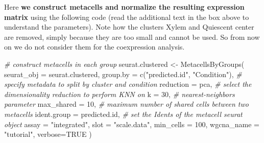 \documentclass[
  letterpaper,
  DIV=11,
  numbers=noendperiod]{scrartcl}
\newenvironment{Shaded}{\begin{snugshade}}{\end{snugshade}}
\newcommand{\AttributeTok}[1]{\textcolor[rgb]{0.49,0.56,0.16}{#1}}
\newcommand{\CommentTok}[1]{\textcolor[rgb]{0.38,0.63,0.69}{\textit{#1}}}
\newcommand{\ConstantTok}[1]{\textcolor[rgb]{0.53,0.00,0.00}{#1}}
\newcommand{\DecValTok}[1]{\textcolor[rgb]{0.25,0.63,0.44}{#1}}
\newcommand{\FunctionTok}[1]{\textcolor[rgb]{0.02,0.16,0.49}{#1}}
\newcommand{\NormalTok}[1]{\textcolor[rgb]{0.00,0.44,0.13}{#1}}
\newcommand{\OtherTok}[1]{\textcolor[rgb]{0.00,0.44,0.13}{#1}}
\newcommand{\StringTok}[1]{\textcolor[rgb]{0.25,0.44,0.63}{#1}}
\begin{document}
Here \textbf{we construct metacells and normalize the resulting
expression matrix} using the following code (read the additional text in
the box above to understand the parameters). Note how the clusters Xylem
and Quiescent center are removed, simply because they are too small and
cannot be used. So from now on we do not consider them for the
coexpression analysis.

\begin{Shaded}
\begin{Highlighting}[]
\CommentTok{\# construct metacells  in each group}
\NormalTok{seurat.clustered }\OtherTok{\textless{}{-}} \FunctionTok{MetacellsByGroups}\NormalTok{(}
  \AttributeTok{seurat\_obj =}\NormalTok{ seurat.clustered,}
  \AttributeTok{group.by =} \FunctionTok{c}\NormalTok{(}\StringTok{"predicted.id"}\NormalTok{, }\StringTok{"Condition"}\NormalTok{), }\CommentTok{\# specify metadata to split by cluster and condition}
  \AttributeTok{reduction =} \StringTok{\textquotesingle{}pca\textquotesingle{}}\NormalTok{, }\CommentTok{\# select the dimensionality reduction to perform KNN on}
  \AttributeTok{k =} \DecValTok{30}\NormalTok{, }\CommentTok{\# nearest{-}neighbors parameter}
  \AttributeTok{max\_shared =} \DecValTok{10}\NormalTok{, }\CommentTok{\# maximum number of shared cells between two metacells}
  \AttributeTok{ident.group =} \StringTok{\textquotesingle{}predicted.id\textquotesingle{}}\NormalTok{, }\CommentTok{\# set the Idents of the metacell seurat object}
  \AttributeTok{assay =} \StringTok{"integrated"}\NormalTok{,}
  \AttributeTok{slot =} \StringTok{"scale.data"}\NormalTok{,}
  \AttributeTok{min\_cells =} \DecValTok{100}\NormalTok{,}
  \AttributeTok{wgcna\_name =} \StringTok{"tutorial"}\NormalTok{,}
  \AttributeTok{verbose=}\ConstantTok{TRUE}
\NormalTok{)}
\end{Highlighting}
\end{Shaded}
\end{document}
